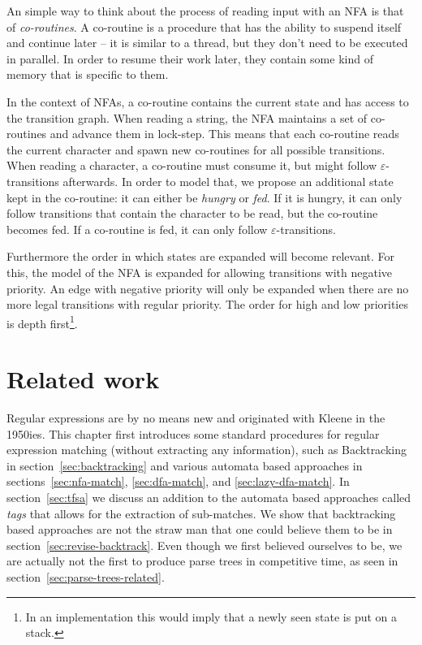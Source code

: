 \documentclass[11pt,a4paper,twoside,openright]{Thesis}
\theoremstyle{definition}
\newcommand{\Secref}[1]{section~\ref{sec:#1}}
\newcommand{\seclabel}[1]{\label{sec:#1}}
\begin{document}
An simple way to think about the process of reading input with an NFA is that
of \emph{co-routines}. A co-routine is a procedure that has the ability to
suspend itself and continue later -- it is similar to a thread, but they
don't need to be executed in parallel. In order to resume their work later,
they contain some kind of memory that is specific to them.

In the context of NFAs, a co-routine contains the current state and has access
to the transition graph. When reading a
string, the NFA maintains a set of co-routines and advance them in
lock-step. This means that each co-routine reads the current character and
spawn new co-routines for all possible transitions. When reading a character,
a co-routine must consume it, but might follow $\varepsilon$-transitions
afterwards. In order to model that, we propose an additional state kept in
the co-routine: it can either be \emph{hungry} or \emph{fed}. If it is
hungry, it can only follow transitions that contain the character to be read,
but the co-routine becomes fed. If a co-routine is fed, it can only
follow $\varepsilon$-transitions.

Furthermore the order in which states are expanded will become relevant. For
this, the model of the NFA is expanded for allowing transitions with negative
priority. An edge with negative priority will only be expanded when there are
no more legal transitions with regular priority. The order for high and low
priorities is depth first\footnote{In an implementation this would imply that
a newly seen state is put on a stack.}.

\chapter{Related work}
\seclabel{related}
Regular expressions are by no means new and originated with Kleene in the
1950ies\cite{Sips05a}. This chapter first introduces some standard
procedures for regular expression matching (without extracting any
information), such as Backtracking in \Secref{backtracking} and various
automata based approaches in sections~\ref{sec:nfa-match}, \ref{sec:dfa-match},
and \ref{sec:lazy-dfa-match}. In \Secref{tfsa} we discuss an addition to
the automata based approaches called \emph{tags} that allows for the extraction
of sub-matches. We show that backtracking based approaches are not the
straw man that one could believe them to be in \Secref{revise-backtrack}.
Even though we first believed ourselves to be, we are actually not the first
to produce parse trees in competitive time, as seen in \Secref{parse-trees-related}.
\end{document}
